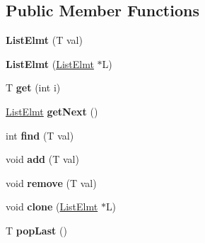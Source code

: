 \subsection*{Public Member Functions}
\begin{DoxyCompactItemize}
\item 
\mbox{\label{class_list_1_1_list_elmt_ab438c015ce36ca7c14af6adaa6a08d93}} 
{\bfseries List\+Elmt} (T val)
\item 
\mbox{\label{class_list_1_1_list_elmt_a3097e5bc3f9300c7706cae4f88dbd50b}} 
{\bfseries List\+Elmt} (\mbox{\hyperlink{class_list_1_1_list_elmt}{List\+Elmt}} $\ast$L)
\item 
\mbox{\label{class_list_1_1_list_elmt_af00a0092ec26ea7650233c5870b519f8}} 
T {\bfseries get} (int i)
\item 
\mbox{\label{class_list_1_1_list_elmt_a6df28778d2345a67b1b5c2818b655d1b}} 
\mbox{\hyperlink{class_list_1_1_list_elmt}{List\+Elmt}} {\bfseries get\+Next} ()
\item 
\mbox{\label{class_list_1_1_list_elmt_acdadb7aaa8f64139345af339c0a2d403}} 
int {\bfseries find} (T val)
\item 
\mbox{\label{class_list_1_1_list_elmt_a611d9095a4ad03667ae2d4645f4183fa}} 
void {\bfseries add} (T val)
\item 
\mbox{\label{class_list_1_1_list_elmt_a1a5d2c9bf849b19bb10ccbf61191b9fe}} 
void {\bfseries remove} (T val)
\item 
\mbox{\label{class_list_1_1_list_elmt_a6076563091d1202d4d2a2e2e4343fee6}} 
void {\bfseries clone} (\mbox{\hyperlink{class_list_1_1_list_elmt}{List\+Elmt}} $\ast$L)
\item 
\mbox{\label{class_list_1_1_list_elmt_a189acffdbee3c417833df53767b1d913}} 
T {\bfseries pop\+Last} ()
\item 
\mbox{\label{class_list_1_1_list_elmt_a720cdaba23537a0ba23ed4879d74a5eb}} 

\end{DoxyCompactItemize}
